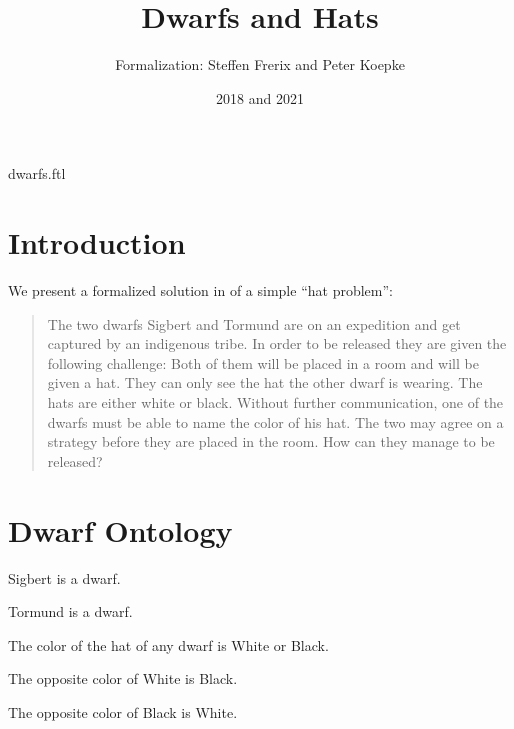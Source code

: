 \documentclass{article}
\title{Dwarfs and Hats}
\author{\Naproche Formalization: Steffen Frerix and Peter Koepke}
\date{2018 and 2021}
\begin{document}
\maketitle

\begin{smodule}{dwarfs.ftl}
  \section{Introduction}

  We present a formalized solution in \Naproche of a simple “hat problem”:

  \begin{quotation}
    \noindent The two dwarfs Sigbert and Tormund are on an expedition and get captured by an indigenous tribe.
    In order to be released they are given the following challenge:
    Both of them will be placed in a room and will be given a hat.
    They can only see the hat the other dwarf is wearing.
    The hats are either white or black.
    Without further communication, one of the dwarfs must be able to name the color of his hat.
    The two may agree on a strategy before they are placed in the room.
    How can they manage to be released?
  \end{quotation}


  \section{Dwarf Ontology}


  \begin{forthel}
    \begin{signature}
      Sigbert is a dwarf.
    \end{signature}
    \begin{signature}
      Tormund is a dwarf.
    \end{signature}
    \begin{axiom}
      The color of the hat of any dwarf is White or Black.
    \end{axiom}
    \begin{axiom}
      The opposite color of White is Black.
    \end{axiom}
    \begin{axiom}
      The opposite color of Black is White.
    \end{axiom}
  \end{forthel}



\end{smodule}
\end{document}
